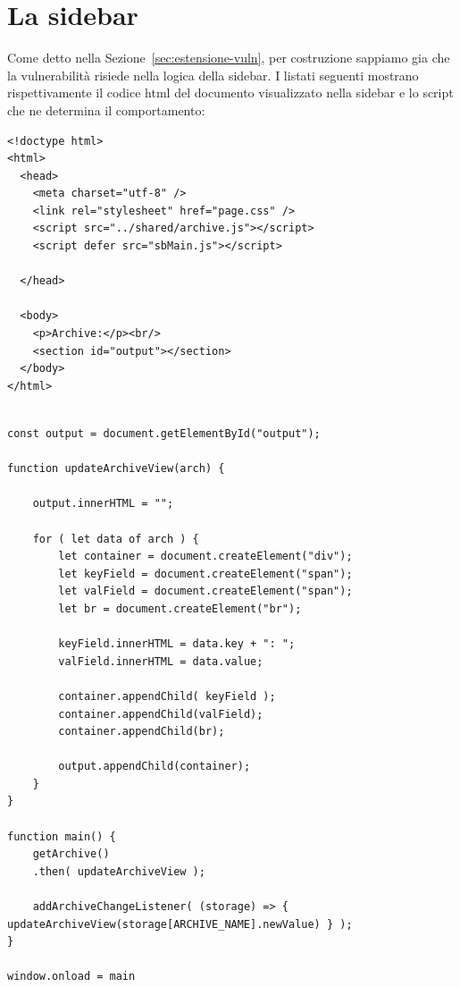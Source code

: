 \documentclass{sapthesis}
\newcommand{\code}[1]{\texttt{#1}}
\newcommand{\file}[1]{\code{#1}}
\newcommand{\refSection}[1]{Sezione~\ref{#1}}
\begin{document}
    \section{La sidebar}
    \label{sec:analisi-vuln-sidebar}
        Come detto nella \refSection{sec:estensione-vuln}, per costruzione sappiamo gia che la vulnerabilità
        risiede nella logica della sidebar. I listati seguenti mostrano rispettivamente il codice html del documento
        visualizzato nella sidebar e lo script che ne determina il comportamento:

        \begin{lstlisting}[caption={Contenuto di \file{sidebar/page.html}},captionpos=b,label=code:sidebar/page.html]
<!doctype html>
<html>
  <head>
    <meta charset="utf-8" />
    <link rel="stylesheet" href="page.css" />
    <script src="../shared/archive.js"></script>
    <script defer src="sbMain.js"></script>
    
  </head>

  <body>
    <p>Archive:</p><br/>
    <section id="output"></section>
  </body>
</html>
        \end{lstlisting}

        \begin{lstlisting}[caption={Contenuto di \file{sidebar/sbMain.js}},label=code:sidebar/sbMain.js]

const output = document.getElementById("output");

function updateArchiveView(arch) {

    output.innerHTML = "";

    for ( let data of arch ) {
        let container = document.createElement("div");
        let keyField = document.createElement("span");
        let valField = document.createElement("span");
        let br = document.createElement("br");

        keyField.innerHTML = data.key + ": ";
        valField.innerHTML = data.value;

        container.appendChild( keyField );
        container.appendChild(valField);
        container.appendChild(br);

        output.appendChild(container);
    }
}

function main() {
    getArchive()
    .then( updateArchiveView );

    addArchiveChangeListener( (storage) => { updateArchiveView(storage[ARCHIVE_NAME].newValue) } );
}

window.onload = main
        \end{lstlisting}
\end{document}
